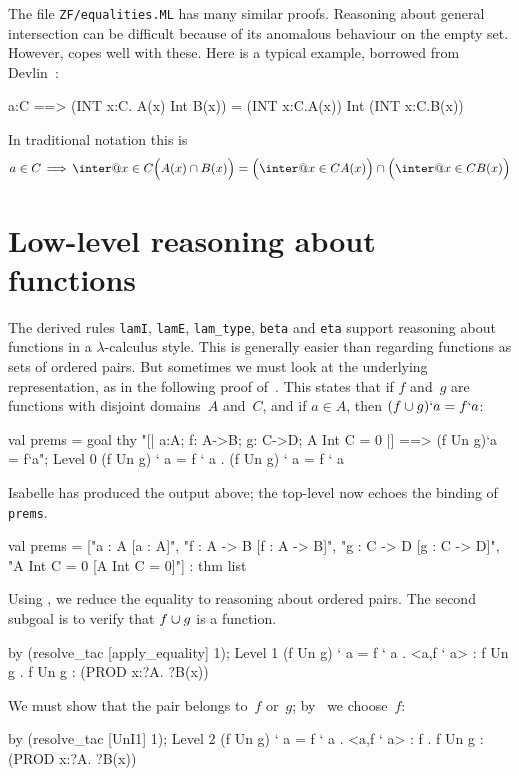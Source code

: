 The file {\tt ZF/equalities.ML} has many similar proofs.  Reasoning about
general intersection can be difficult because of its anomalous behaviour on
the empty set.  However,  copes well with these.  Here is
a typical example, borrowed from Devlin~\cite[page 12]{devlin79}:
\begin{ttbox}
a:C ==> (INT x:C. A(x) Int B(x)) = (INT x:C.A(x)) Int (INT x:C.B(x))
\end{ttbox}
In traditional notation this is
\[ a\in C \,\Imp\, \inter@{x\in C} \Bigl(A(x) \int B(x)\Bigr) =        
       \Bigl(\inter@{x\in C} A(x)\Bigr)  \int  
       \Bigl(\inter@{x\in C} B(x)\Bigr)  \]

\section{Low-level reasoning about functions}
The derived rules {\tt lamI}, {\tt lamE}, {\tt lam_type}, {\tt beta}
and {\tt eta} support reasoning about functions in a
$\lambda$-calculus style.  This is generally easier than regarding
functions as sets of ordered pairs.  But sometimes we must look at the
underlying representation, as in the following proof
of~.  This states that if $f$ and~$g$ are
functions with disjoint domains~$A$ and~$C$, and if $a\in A$, then
$(f\cup g)`a = f`a$:
\begin{ttbox}
val prems = goal thy
    "[| a:A;  f: A->B;  g: C->D;  A Int C = 0 |] ==>  \ttback
\ttback    (f Un g)`a = f`a";
{\out Level 0}
{\out (f Un g) ` a = f ` a}
{. (f Un g) ` a = f ` a}
\end{ttbox}
Isabelle has produced the output above; the \ML{} top-level now echoes the
binding of {\tt prems}.
\begin{ttbox}
{\out val prems = ["a : A  [a : A]",}
{\out              "f : A -> B  [f : A -> B]",}
{\out              "g : C -> D  [g : C -> D]",}
{\out              "A Int C = 0  [A Int C = 0]"] : thm list}
\end{ttbox}
Using , we reduce the equality to reasoning about
ordered pairs.  The second subgoal is to verify that $f\cup g$ is a function.
\begin{ttbox}
by (resolve_tac [apply_equality] 1);
{\out Level 1}
{\out (f Un g) ` a = f ` a}
{. <a,f ` a> : f Un g}
{. f Un g : (PROD x:?A. ?B(x))}
\end{ttbox}
We must show that the pair belongs to~$f$ or~$g$; by~ we
choose~$f$:
\begin{ttbox}
by (resolve_tac [UnI1] 1);
{\out Level 2}
{\out (f Un g) ` a = f ` a}
{. <a,f ` a> : f}
{. f Un g : (PROD x:?A. ?B(x))}
\end{ttbox}
